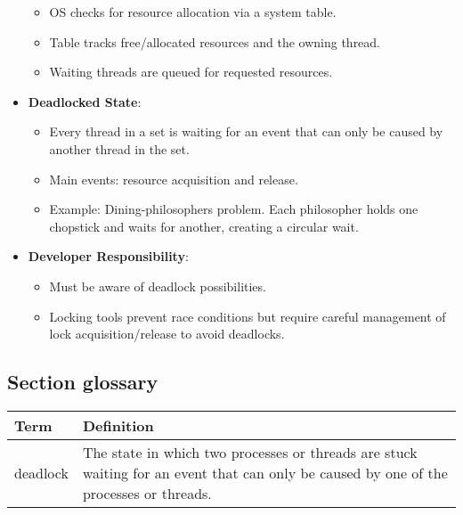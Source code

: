 \begin{itemize}
\begin{itemize}
        \item OS checks for resource allocation via a system table.
        \item Table tracks free/allocated resources and the owning thread.
        \item Waiting threads are queued for requested resources.
    \end{itemize}
    \item \textbf{Deadlocked State}:
    \begin{itemize}
        \item Every thread in a set is waiting for an event that can only be caused by another thread in the set.
        \item Main events: resource acquisition and release.
        \item Example: Dining-philosophers problem. Each philosopher holds one chopstick and waits for another, creating a circular wait.
    \end{itemize}
    \item \textbf{Developer Responsibility}:
    \begin{itemize}
        \item Must be aware of deadlock possibilities.
        \item Locking tools prevent race conditions but require careful management of lock acquisition/release to avoid deadlocks.
    \end{itemize}
\end{itemize}

\subsection{Section glossary}
\begin{tabular}{p{}p{}}
    \toprule
    \textbf{Term} & \textbf{Definition} \\
    \midrule
    deadlock & The state in which two processes or threads are stuck waiting for an event that can only be caused by one of the processes or threads. \\
    \bottomrule
\end{tabular}

